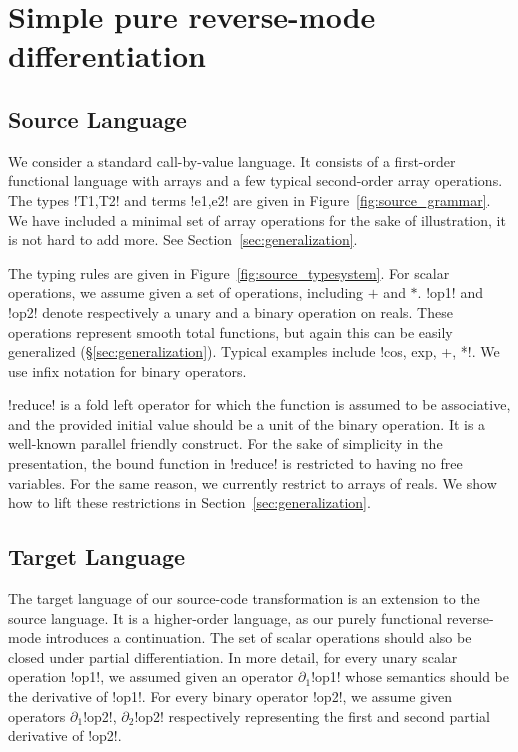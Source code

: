 \section{Simple pure reverse-mode differentiation}
\label{sec:simplediff}

\subsection{Source Language}
\label{sub:sourcelang}

We consider a standard call-by-value language. 
It consists of a first-order functional language with arrays and a few typical second-order array operations. 
The types !T1,T2! and terms !e1,e2! are given in Figure~\ref{fig:source_grammar}.
We have included a minimal set of array operations for the sake of illustration,  it is not hard to add more.
See Section~\ref{sec:generalization}.



The typing rules are given in Figure~\ref{fig:source_typesystem}. 
For scalar operations, we assume given a set of operations, including $+$ and $*$. 
!op1! and !op2! denote respectively a unary and a binary operation on reals. 
These operations represent smooth total functions, 
but again this can be easily generalized (\S\ref{sec:generalization}).  
Typical examples include !cos, exp, +, *!. 
We use infix notation for binary operators.

!reduce! is a fold left operator for which the function is assumed to be associative, 
and the provided initial value should be a unit of the binary operation.
It is a well-known parallel friendly construct. For the sake of simplicity in the presentation, the bound function in !reduce! 
is restricted to having no free variables. For the same reason, we currently restrict to arrays of reals.
We show how to lift these restrictions in Section~\ref{sec:generalization}.



\subsection{Target Language}

The target language of our source-code transformation is an extension to the source language.
It is a higher-order language, as our purely functional reverse-mode introduces a continuation.
The set of scalar operations should also be closed under partial differentiation. 
In more detail, for every unary scalar operation !op1!, 
we assumed given an operator $\partial_1$!op1! whose semantics should be the derivative of !op1!.
For every binary operator !op2!, we assume given operators $\partial_1$!op2!, $\partial_2$!op2! 
respectively representing the first and second partial derivative of !op2!.

